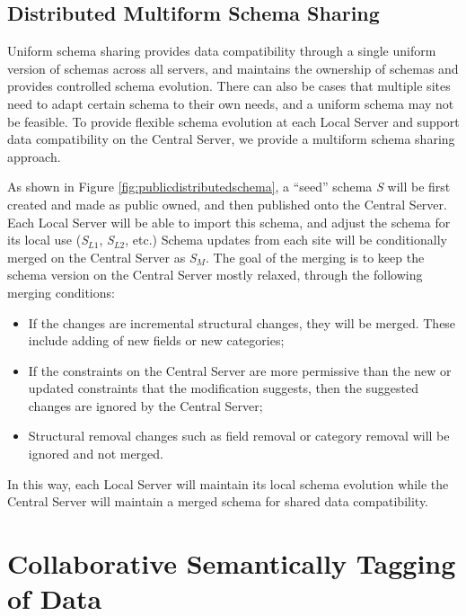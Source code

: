 \documentclass{doublecol-new}
\theoremstyle{TH}{
\newtheorem{lemma}{Lemma}
\newtheorem{theorem}[lemma]{Theorem}
\newtheorem{corrolary}[lemma]{Corrolary}
\newtheorem{conjecture}[lemma]{Conjecture}
\newtheorem{proposition}[lemma]{Proposition}
\newtheorem{claim}[lemma]{Claim}
\newtheorem{stheorem}[lemma]{Wrong Theorem}
\newtheorem{algorithm}{Algorithm}
}
\theoremstyle{THrm}{
\newtheorem{definition}{Definition}[section]
\newtheorem{question}{Question}[section]
\newtheorem{remark}{Remark}
\newtheorem{scheme}{Scheme}
}
\theoremstyle{THhit}{
\newtheorem{case}{Case}[section]
}
\begin{document}
\subsection{Distributed Multiform Schema Sharing} \label{sec:multiformschema}

Uniform schema sharing provides data compatibility through a single
uniform version of schemas across all servers, and maintains the
ownership of schemas and provides controlled schema evolution. There
can also be cases that multiple sites need to adapt certain schema
to their own needs, and a uniform schema may not be feasible. To
provide flexible schema evolution at each Local Server and support
data compatibility on the Central Server, we provide a multiform
schema sharing approach.

As shown in Figure \ref{fig:publicdistributedschema}, a ``seed'' schema {\em
S} will be first created and made as public owned, and then published onto the
Central Server. Each Local Server will be able to import this schema, and
adjust the schema for its local use ({\em S$_{L1}$}, {\em S$_{L2}$}, etc.)
Schema updates from each site will be conditionally merged on the Central
Server as {\em S$_M$}. The goal of the merging  is to keep the schema version
on the Central Server mostly relaxed, through the following merging
conditions:

\begin{itemize}
  \item If the changes are incremental structural changes, they will be merged. These include
  adding of new fields or new categories;
  \item If the constraints on the Central Server are more permissive
   than the new or updated constraints that the modification suggests,
   then the suggested changes are ignored by the Central Server;
  \item Structural removal changes such as field removal or category removal
  will be ignored and not merged.
\end{itemize}


In this way, each Local Server will maintain its local schema evolution while
the Central Server will maintain a merged schema for shared data
compatibility.




\section{Collaborative Semantically Tagging of Data}\label{sec:tag}
\end{document}
